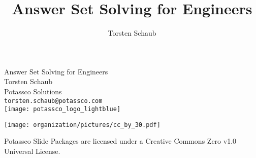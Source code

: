 \title{Answer Set Solving for Engineers}
\author{Torsten Schaub}%
\begin{frame}[c]
  \bigskip
  \vfill
  \begin{center}%
    \alert{\huge Answer Set Solving for Engineers}
    \bigskip
    \bigskip
    \\
    Torsten Schaub\\
    Potassco Solutions\\
    \texttt{torsten.schaub@potassco.com}\\
    \bigskip
    \texttt{[image: potassco\_logo\_lightblue]}
  \end{center}
  \bigskip
  \begin{center}
    \texttt{[image: organization/pictures/cc\_by\_30.pdf]} %
    \par
    {\tiny Potassco Slide Packages are licensed under a Creative Commons Zero v1.0 Universal License.}
  \end{center}
\end{frame}
%
